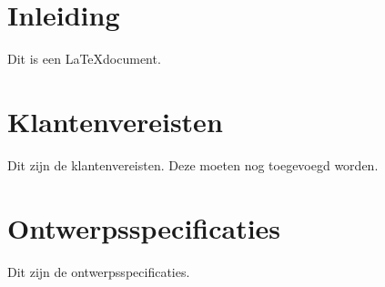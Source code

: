 \documentclass{article}
\begin{document}
\section{Inleiding}

Dit is een \LaTeX document.

\section{Klantenvereisten}

Dit zijn de klantenvereisten.
Deze moeten nog toegevoegd worden.

\section{Ontwerpsspecificaties}

Dit zijn de ontwerpsspecificaties.
\end{document}
